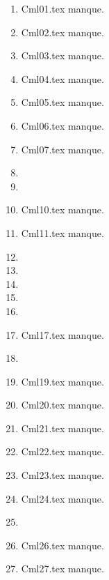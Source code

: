 \begin{enumerate}
  \item Cml01.tex manque. 
  \item Cml02.tex manque. 
  \item Cml03.tex manque. 
  \item Cml04.tex manque. 
  \item Cml05.tex manque. 
  \item Cml06.tex manque. 
  \item Cml07.tex manque. 
  \item  
  \item  
  \item Cml10.tex manque. 
  \item Cml11.tex manque. 
  \item  
  \item  
  \item  
  \item  
  \item  
  \item Cml17.tex manque. 
  \item  
  \item Cml19.tex manque. 
  \item Cml20.tex manque. 
  \item Cml21.tex manque. 
  \item Cml22.tex manque. 
  \item Cml23.tex manque. 
  \item Cml24.tex manque. 
  \item  
  \item Cml26.tex manque. 
  \item Cml27.tex manque. 
\end{enumerate} 
